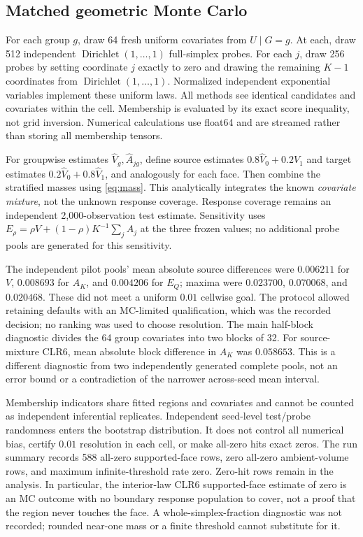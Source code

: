 \documentclass{article}
\theoremstyle{plain}
\begin{document}
\subsection{Matched geometric Monte Carlo}
For each group $g$, draw 64 fresh uniform covariates from $U\mid G=g$. At each, draw 512 independent $\operatorname{Dirichlet}(1,\ldots,1)$ full-simplex probes. For each $j$, draw 256 probes by setting coordinate $j$ exactly to zero and drawing the remaining $K-1$ coordinates from $\operatorname{Dirichlet}(1,\ldots,1)$. Normalized independent exponential variables implement these uniform laws. All methods see identical candidates and covariates within the cell. Membership is evaluated by its exact score inequality, not grid inversion. Numerical calculations use float64 and are streamed rather than storing all membership tensors.

For groupwise estimates $\widehat V_g,\widehat A_{jg}$, define source estimates $0.8\widehat V_0+0.2\widehat V_1$ and target estimates $0.2\widehat V_0+0.8\widehat V_1$, and analogously for each face. Then combine the stratified masses using \eqref{eq:mass}. This analytically integrates the known \emph{covariate mixture}, not the unknown response coverage. Response coverage remains an independent 2,000-observation test estimate. Sensitivity uses $E_\rho=\rho V+(1-\rho)K^{-1}\sum_jA_j$ at the three frozen values; no additional probe pools are generated for this sensitivity.

The independent pilot pools' mean absolute source differences were $0.006211$ for $V$, $0.008693$ for $A_K$, and $0.004206$ for $E_Q$; maxima were $0.023700$, $0.070068$, and $0.020468$. These did not meet a uniform $0.01$ cellwise goal. The protocol allowed retaining defaults with an MC-limited qualification, which was the recorded decision; no ranking was used to choose resolution. The main half-block diagnostic divides the 64 group covariates into two blocks of 32. For source-mixture CLR6, mean absolute block difference in $A_K$ was $0.058653$. This is a different diagnostic from two independently generated complete pools, not an error bound or a contradiction of the narrower across-seed mean interval.

Membership indicators share fitted regions and covariates and cannot be counted as independent inferential replicates. Independent seed-level test/probe randomness enters the bootstrap distribution. It does not control all numerical bias, certify $0.01$ resolution in each cell, or make all-zero hits exact zeros. The run summary records 588 all-zero supported-face rows, zero all-zero ambient-volume rows, and maximum infinite-threshold rate zero. Zero-hit rows remain in the analysis. In particular, the interior-law CLR6 supported-face estimate of zero is an MC outcome with no boundary response population to cover, not a proof that the region never touches the face. A whole-simplex-fraction diagnostic was not recorded; rounded near-one mass or a finite threshold cannot substitute for it.
\end{document}
